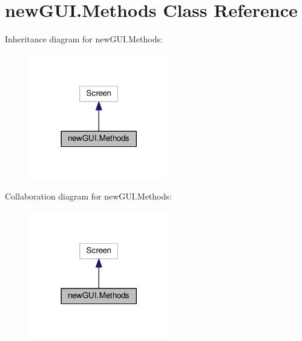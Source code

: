 \hypertarget{classnewGUI_1_1Methods}{}\section{new\+G\+U\+I.\+Methods Class Reference}
\label{classnewGUI_1_1Methods}


Inheritance diagram for new\+G\+U\+I.\+Methods\+:
\nopagebreak
\begin{figure}[H]
\begin{center}
\leavevmode
\includegraphics[width=173pt]{classnewGUI_1_1Methods__inherit__graph}
\end{center}
\end{figure}


Collaboration diagram for new\+G\+U\+I.\+Methods\+:
\nopagebreak
\begin{figure}[H]
\begin{center}
\leavevmode
\includegraphics[width=173pt]{classnewGUI_1_1Methods__coll__graph}
\end{center}
\end{figure}
